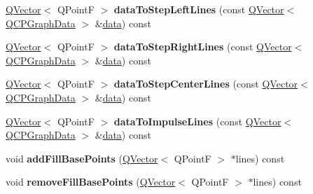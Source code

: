 \begin{DoxyCompactItemize}
\item 
\hyperlink{class_q_vector}{Q\+Vector}$<$ Q\+PointF $>$ {\bfseries data\+To\+Step\+Left\+Lines} (const \hyperlink{class_q_vector}{Q\+Vector}$<$ \hyperlink{class_q_c_p_graph_data}{Q\+C\+P\+Graph\+Data} $>$ \&\hyperlink{class_q_c_p_graph_a04514a2b1fb61a280ead66abe80b89ab}{data}) const \hypertarget{class_q_c_p_graph_a64423430763ee0ce7b3b3274e4df3e56}{}\label{class_q_c_p_graph_a64423430763ee0ce7b3b3274e4df3e56}

\item 
\hyperlink{class_q_vector}{Q\+Vector}$<$ Q\+PointF $>$ {\bfseries data\+To\+Step\+Right\+Lines} (const \hyperlink{class_q_vector}{Q\+Vector}$<$ \hyperlink{class_q_c_p_graph_data}{Q\+C\+P\+Graph\+Data} $>$ \&\hyperlink{class_q_c_p_graph_a04514a2b1fb61a280ead66abe80b89ab}{data}) const \hypertarget{class_q_c_p_graph_a194ad6590b465a6ac6d393b492798a6f}{}\label{class_q_c_p_graph_a194ad6590b465a6ac6d393b492798a6f}

\item 
\hyperlink{class_q_vector}{Q\+Vector}$<$ Q\+PointF $>$ {\bfseries data\+To\+Step\+Center\+Lines} (const \hyperlink{class_q_vector}{Q\+Vector}$<$ \hyperlink{class_q_c_p_graph_data}{Q\+C\+P\+Graph\+Data} $>$ \&\hyperlink{class_q_c_p_graph_a04514a2b1fb61a280ead66abe80b89ab}{data}) const \hypertarget{class_q_c_p_graph_a2ad792d49fc4b613c1fc05544f530ef8}{}\label{class_q_c_p_graph_a2ad792d49fc4b613c1fc05544f530ef8}

\item 
\hyperlink{class_q_vector}{Q\+Vector}$<$ Q\+PointF $>$ {\bfseries data\+To\+Impulse\+Lines} (const \hyperlink{class_q_vector}{Q\+Vector}$<$ \hyperlink{class_q_c_p_graph_data}{Q\+C\+P\+Graph\+Data} $>$ \&\hyperlink{class_q_c_p_graph_a04514a2b1fb61a280ead66abe80b89ab}{data}) const \hypertarget{class_q_c_p_graph_a0aa76bf06582287c7ab3f32a83fd94f1}{}\label{class_q_c_p_graph_a0aa76bf06582287c7ab3f32a83fd94f1}

\item 
void {\bfseries add\+Fill\+Base\+Points} (\hyperlink{class_q_vector}{Q\+Vector}$<$ Q\+PointF $>$ $\ast$lines) const \hypertarget{class_q_c_p_graph_a259f6fc4d2568201abb5f1b69f1c2baf}{}\label{class_q_c_p_graph_a259f6fc4d2568201abb5f1b69f1c2baf}

\item 
void {\bfseries remove\+Fill\+Base\+Points} (\hyperlink{class_q_vector}{Q\+Vector}$<$ Q\+PointF $>$ $\ast$lines) const \hypertarget{class_q_c_p_graph_ae58eab7a1fd2ad104b0bec80cf6a30fd}{}\label{class_q_c_p_graph_ae58eab7a1fd2ad104b0bec80cf6a30fd}


\end{DoxyCompactItemize}
